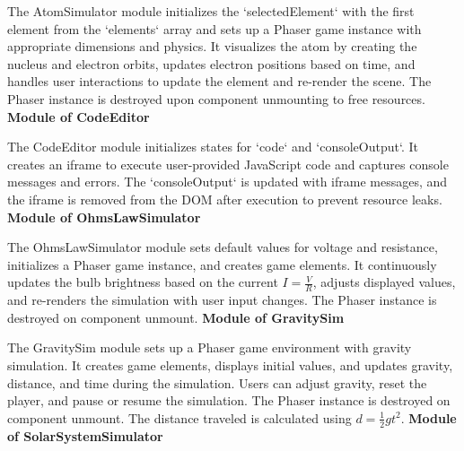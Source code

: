 The AtomSimulator module initializes the `selectedElement` with the first element from the `elements` array and sets up a Phaser game instance with appropriate dimensions and physics. It visualizes the atom by creating the nucleus and electron orbits, updates electron positions based on time, and handles user interactions to update the element and re-render the scene. The Phaser instance is destroyed upon component unmounting to free resources.
\newline
\textbf{Module of CodeEditor}

The CodeEditor module initializes states for `code` and `consoleOutput`. It creates an iframe to execute user-provided JavaScript code and captures console messages and errors. The `consoleOutput` is updated with iframe messages, and the iframe is removed from the DOM after execution to prevent resource leaks.
\newline
\textbf{Module of OhmsLawSimulator}

The OhmsLawSimulator module sets default values for voltage and resistance, initializes a Phaser game instance, and creates game elements. It continuously updates the bulb brightness based on the current \( I = \frac{V}{R} \), adjusts displayed values, and re-renders the simulation with user input changes. The Phaser instance is destroyed on component unmount.
\newline
\textbf{Module of GravitySim}

The GravitySim module sets up a Phaser game environment with gravity simulation. It creates game elements, displays initial values, and updates gravity, distance, and time during the simulation. Users can adjust gravity, reset the player, and pause or resume the simulation. The Phaser instance is destroyed on component unmount. The distance traveled is calculated using \( d = \frac{1}{2} g t^2 \).
\newline
\textbf{Module of SolarSystemSimulator}

